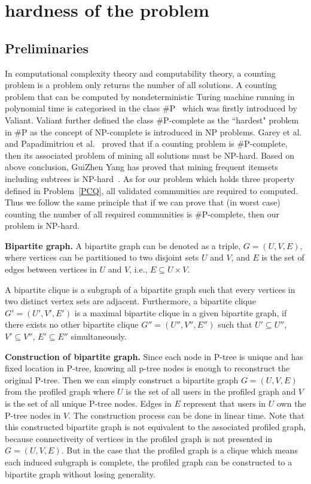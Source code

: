 \clearpage
\section{hardness of the problem}
\label{PCQharness}

\subsection{Preliminaries}
In computational complexity theory and computability theory, a counting problem is a problem only returns the number of all solutions. A counting problem that can be computed by nondeterministic Turing machine running in polynomial time is categorised in the class $\#$P~\cite{valiant} which was firstly introduced by Valiant. Valiant further defined the class $\#$P-complete as the ``hardest" problem in $\#$P as the concept of NP-complete is introduced in NP problems. Garey et al.~\cite{garey1979guide} and Papadimitriou et al.~\cite{papadimitriou2003computational} proved that if a counting problem is $\#$P-complete, then its associated problem of mining all solutions must be NP-hard. Based on above conclusion, GuiZhen Yang has proved that mining frequent itemsets including subtrees is NP-hard~\cite{yang2004complexity}. As for our problem which holds three property defined in Problem~\ref{PCQ}, all validated communities are required to computed. Thus we follow the same principle that if we can prove that (in worst case) counting the number of all required communities is $\#$P-complete, then our problem is NP-hard. 

{\bf Bipartite graph.}
A bipartite graph can be denoted as a triple, $G=(U,V,E)$, where vertices can be partitioned to two disjoint sets $U$ and $V$, and $E$ is the set of edges between vertices in $U$ and $V$, i.e., $E\subseteq U\times V$.  

A bipartite clique is a subgraph of a bipartite graph such that every vertices in two distinct vertex sets are adjacent. Furthermore, a bipartite clique $G'=(U',V',E')$ is a maximal bipartite clique in a given bipartite graph, if there exists no other bipartite clique $G''=(U'',V'',E'')$ such that $U'\subseteq U''$, $V'\subseteq V''$, $E'\subseteq E''$ simultaneously. 

{\bf Construction of bipartite graph.}
Since each node in P-tree is unique and has fixed location in P-tree, knowing all p-tree nodes is enough to reconstruct the original P-tree. Then we can simply construct a bipartite graph $G=(U,V,E)$ from the profiled graph where $U$ is the set of all users in the profiled graph and $V$ is the set of all unique P-tree nodes. Edges in $E$ represent that users in $U$ own the P-tree nodes in $V$. The construction process can be done in linear time. Note that this constructed bipartite graph is not equivalent to the associated profiled graph, because connectiveity of vertices in the profiled graph is not presented in $G=(U,V,E)$. But in the case that the profiled graph is a clique which means each induced subgraph is complete, the profiled graph can be constructed to a bipartite graph without losing generality. 

